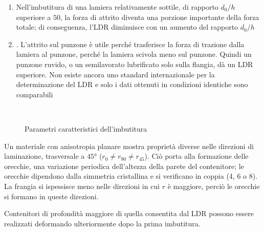 \begin{enumerate}
\item Nell'imbutitura di una lamiera relativamente sottile, di rapporto $d_0/h$ superiore a $50$, la forza 
di attrito diventa una porzione importante della forza totale; di conseguenza, l'\ac{LDR} diminuisce con un aumento del rapporto $d_0/h$
\item . L'attrito sul punzone è utile perché trasferisce la forza di trazione dalla lamiera al punzone, perché la lamiera scivola meno sul punzone. Quindi un punzone ruvido, o un semilavorato lubrificato solo sulla flangia, dà un \ac{LDR} superiore.
Non esiste ancora uno standard internazionale per la determinazione del \ac{LDR} e solo i dati ottenuti in condizioni identiche sono comparabili
\end{enumerate}

\begin{figure}
\centering
{}\\
\quad
{}
\caption{Parametri caratteristici dell'imbutitura}
\label{fig:ParamImbutitura}
\end{figure}

Un materiale con anisotropia planare mostra proprietà diverse nelle direzioni di laminazione, trasversale a $45\unit{\degree}$ ($r_0 \neq r_{90} \neq r_{45}$).
Ciò porta alla formazione delle orecchie, una variazione periodica dell'altezza della parete del contenitore; le orecchie dipendono dalla simmetria cristallina e si verificano in coppia (4, 6 o 8).
La frangia si ispessisce meno nelle direzioni in cui $r$ è maggiore, perciò le orecchie si formano in queste direzioni.

Contenitori di profondità maggiore di quella consentita dal \ac{LDR} possono essere realizzati deformando ulteriormente dopo la prima imbutitura.

